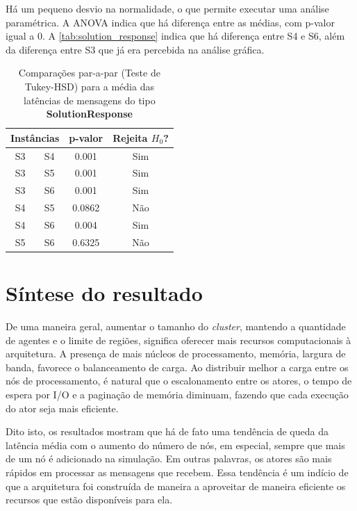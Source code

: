 Há um pequeno desvio na normalidade, o que permite executar uma análise paramétrica. A ANOVA indica que há diferença entre as médias, com p-valor igual a $0$. A \autoref{tab:solution_response} indica que há diferença entre S4 e S6, além da diferença entre S3 que já era percebida na análise gráfica. 

\begin{table}[ht!]
    \centering
    \caption{Comparações par-a-par (Teste de Tukey-HSD) para a média das latências de mensagens do tipo \textbf{SolutionResponse}}
    \begin{tabular}{cccc}
    \toprule
    \multicolumn{2}{c}{\textbf{Instâncias}} & \textbf{p-valor} & \textbf{Rejeita $H_0$?}\\
    \midrule
    S3  &  S4 & 0.001   & Sim  \\
    S3  &  S5 & 0.001   & Sim  \\
    S3  &  S6 & 0.001   & Sim  \\
    S4  &  S5 &  0.0862 & Não \\
    S4  &  S6 &   0.004 & Sim  \\
    S5  &  S6 &  0.6325 & Não \\
     \bottomrule
    \end{tabular}
    \label{tab:solution_response}
\end{table}

\section{Síntese do resultado}
\label{sec:sintese}

De uma maneira geral, aumentar o tamanho do \textit{cluster}, mantendo a quantidade de agentes e o limite de regiões, significa oferecer mais recursos computacionais à arquitetura. A presença de mais núcleos de processamento, memória, largura de banda, favorece o balanceamento de carga. Ao distribuir melhor a carga entre os nós de processamento, é natural que o  escalonamento entre os atores, o tempo de espera por I/O e a paginação de memória diminuam, fazendo que cada execução do ator seja mais eficiente.

Dito isto, os resultados mostram que há de fato uma tendência de queda da latência média com o aumento do número de nós, em especial, sempre que mais de um nó é adicionado na simulação. Em outras palavras, os atores são mais rápidos em processar as mensagens que recebem. Essa tendência é um indício de que a arquitetura foi construída de maneira a aproveitar de maneira eficiente os recursos que estão disponíveis para ela. 

